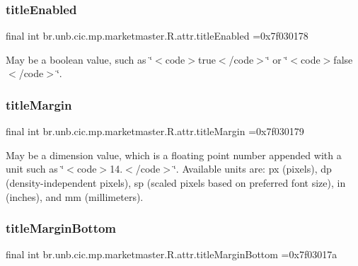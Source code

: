 \subsubsection{\texorpdfstring{title\+Enabled}{titleEnabled}}
{\footnotesize\ttfamily final int br.\+unb.\+cic.\+mp.\+marketmaster.\+R.\+attr.\+title\+Enabled =0x7f030178\hspace{0.3cm}{\ttfamily [static]}}

May be a boolean value, such as \char`\"{}$<$code$>$true$<$/code$>$\char`\"{} or \char`\"{}$<$code$>$false$<$/code$>$\char`\"{}. \mbox{\label{classbr_1_1unb_1_1cic_1_1mp_1_1marketmaster_1_1R_1_1attr_a3c2bfb7296e74462891e48241f37e746}} 
\subsubsection{\texorpdfstring{title\+Margin}{titleMargin}}
{\footnotesize\ttfamily final int br.\+unb.\+cic.\+mp.\+marketmaster.\+R.\+attr.\+title\+Margin =0x7f030179\hspace{0.3cm}{\ttfamily [static]}}

May be a dimension value, which is a floating point number appended with a unit such as \char`\"{}$<$code$>$14.\+5sp$<$/code$>$\char`\"{}. Available units are\+: px (pixels), dp (density-\/independent pixels), sp (scaled pixels based on preferred font size), in (inches), and mm (millimeters). \mbox{\label{classbr_1_1unb_1_1cic_1_1mp_1_1marketmaster_1_1R_1_1attr_a47cea5e8bc26abc7fbc9424066456482}} 
\subsubsection{\texorpdfstring{title\+Margin\+Bottom}{titleMarginBottom}}
{\footnotesize\ttfamily final int br.\+unb.\+cic.\+mp.\+marketmaster.\+R.\+attr.\+title\+Margin\+Bottom =0x7f03017a\hspace{0.3cm}{\ttfamily [static]}}

